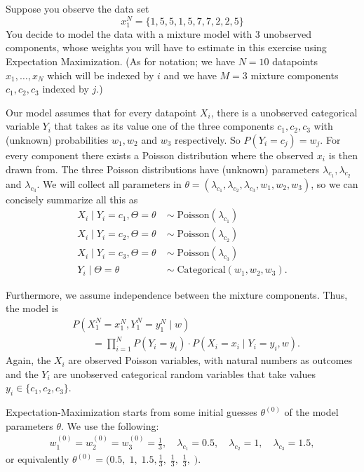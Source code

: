 \documentclass[a4paper,10pt,landscape,twocolumn]{scrartcl}
\begin{document}
\begin{exercise}
	Suppose you observe the data set 
	\[
		x_1^N = \{1, 5, 5, 1, 5, 7, 7, 2, 2, 5\}
	\] 
	You decide to model the data with a mixture model with 3 unobserved components, whose weights you will have to estimate in this exercise using Expectation Maximization. (As for notation; we have $N=10$ datapoints $x_1, \dots, x_N$ which will be indexed by $i$ and we have $M=3$ mixture components $c_1, c_2, c_3$ indexed by $j$.) 
	
	Our model assumes that for every datapoint $X_i$, there is a unobserved categorical variable $Y_i$ that takes as its value one of the three components $c_1, c_2, c_3$ with (unknown) probabilities $w_1, w_2$ and $w_3$ respectively. So $P(Y_i = c_j) = w_j$. For every component there exists a Poisson distribution where the observed $x_i$ is then drawn from. The three Poisson distributions have (unknown) parameters $\lambda_{c_{1}}, \lambda_{c_{2}}$ and $\lambda_{c_{3}}$. We will collect all parameters in $\theta = (\lambda_{c_1}, \lambda_{c_2}, \lambda_{c_3},w_1, w_2, w_3)$, so we can concisely summarize all this as
	\begin{align*}
		X_i \mid Y_i = c_1, \Theta=\theta \; &\sim \; \text{Poisson}(\lambda_{c_1})\\
		X_i \mid Y_i = c_2, \Theta=\theta \; &\sim \; \text{Poisson}(\lambda_{c_2})\\
		X_i \mid Y_i = c_3, \Theta=\theta \; &\sim \; \text{Poisson}(\lambda_{c_3})\\
		Y_i \mid \Theta=\theta \; &\sim \; \text{Categorical}(w_1, w_2, w_3).
	\end{align*}

	Furthermore, we assume independence between the mixture components. Thus, the model is
	\begin{align*}
	&P(X_1^N=x_1^N, Y_1^N=y_1^N\mid w) \\
		&\qquad= \prod_{i=1}^N P(Y_{i}=y_{i}) \cdot P(X_{i}=x_{i}\mid Y_{i}=y_{i}, w).
	\end{align*}
	Again, the $X_i$ are observed Poisson variables, with natural numbers as outcomes and the $Y_i$ are unobserved categorical random variables that take values $y_i \in \{c_1, c_2, c_3\}$.
	
	Expectation-Maximization starts from some initial guesses $\theta^{(0)}$ of the model parameters $\theta$. We use the following:
	\begin{align*}
	w_1^{(0)} = w_2^{(0)} = w_3^{(0)} = \frac{1}{3}, \quad \lambda_{c_1} = 0.5, \quad \lambda_{c_2} = 1, \quad \lambda_{c_3} = 1.5,
	\end{align*}
	or equivalently $\theta^{(0)} = \bigl(0.5,\; 1,\; 1.5, \frac{1}{3},\; \frac 1 3,\; \frac 1 3,\; \bigr)$.


\end{exercise}
\end{document}
